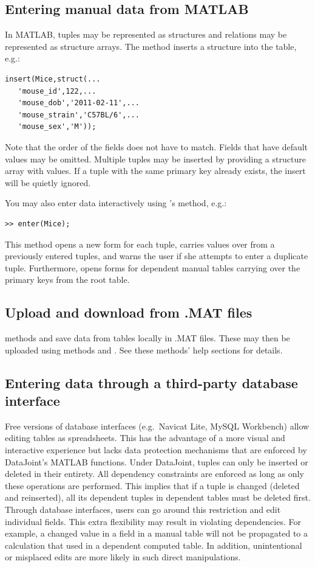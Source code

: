\documentclass[10pt]{article}
\begin{document}
\subsection{Entering manual data from MATLAB}
In MATLAB, tuples may be represented as structures and relations may be represented as structure arrays.  The  method  inserts a structure into the table, e.g.:
\begin{lstlisting}
insert(Mice,struct(...
   'mouse_id',122,...
   'mouse_dob','2011-02-11',...
   'mouse_strain','C57BL/6',...
   'mouse_sex','M'));
\end{lstlisting}
Note that the order of the fields does not have to match. Fields that have default values may be omitted.  Multiple tuples may be inserted by providing a structure array with values. If a tuple with the same primary key already exists, the insert will be quietly ignored. 

You may also enter data interactively using 's  method, e.g.:
\begin{lstlisting}
>> enter(Mice);
\end{lstlisting}  
This method opens a new form for each tuple, carries values over from a previously entered tuples, and warns the user if she attempts to enter a duplicate tuple. Furthermore,  opens forms for dependent manual tables carrying over the primary keys from the root table.

\subsection{Upload and download from .MAT files}
 methods  and  save data from tables locally in .MAT files.  These may then be uploaded using methods  and .  See these methods' help sections for details. 

\subsection{Entering data through a third-party database interface}
Free versions of database interfaces (e.g.~Navicat Lite, MySQL Workbench) allow editing tables as spreadsheets.  This has the advantage of a more visual and interactive experience but lacks data protection mechanisms that are enforced by DataJoint's MATLAB functions.  Under DataJoint, tuples can only be inserted or deleted in their entirety. All dependency constraints are enforced as long as only these operations are performed.  This implies that if a tuple is changed (deleted and reinserted), all its dependent tuples in dependent tables must be deleted first.  Through database interfaces, users can go around this restriction and edit individual fields.  This extra flexibility may result in violating dependencies.  For example, a changed value in a field in a manual table will not be propagated to a calculation that used in a dependent computed table.  In addition, unintentional or misplaced edits are more likely in such direct manipulations. 
\end{document}
